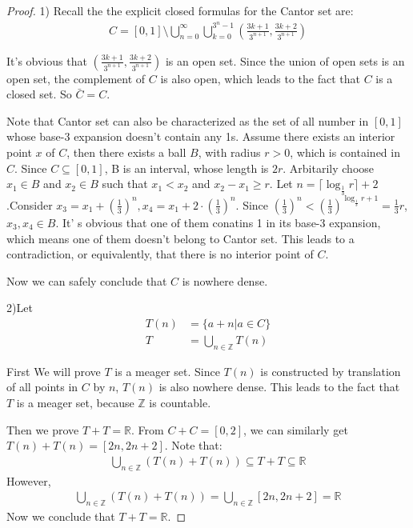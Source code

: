 \documentclass[a4paper, linespread=1.5]{article}
\begin{document}
	\begin{proof}
		1) Recall the the explicit closed formulas for the Cantor set are:
		\begin{align*}
			C= [0,1]\setminus \bigcup\limits_{n=0}^\infty \bigcup\limits_{k=0}^{3^n-1}(\frac{3k+1}{3^{n+1}},\frac{3k+2}{3^{n+1}})
		\end{align*}
		
		It's obvious that $(\frac{3k+1}{3^{n+1}},\frac{3k+2}{3^{n+1}})$ is an open set. Since the union of open sets is an open set, the complement of $C$ is also open, which leads to the fact that $C$ is a closed set. So $\bar{C}=C$.
		
		Note that Cantor set can also be characterized as the set of all number in $[0,1]$ whose base-3 expansion doesn't contain any 1s. Assume there exists an interior point $x$ of $C$, then 
		there exists a ball $B$, with radius $r > 0$, which is contained in $C$. Since $C \subseteq [0,1]$, B is an interval, whose length is $2r$. Arbitarily choose $x_1 \in B$ and $x_2\in B$ such that $x_1<x_2$ and $x_2-x_1\ge r$. Let $n=\lceil\log_{\frac{1}{3}}r\rceil+2$.Consider $x_3=x_1+(\frac{1}{3})^n,x_4=x_1+2\cdot(\frac{1}{3})^n$. Since $(\frac{1}{3})^n<(\frac{1}{3})^{\log_\frac{1}{3}r+1}=\frac{1}{3}r$, $x_3,x_4\in B$.  It' s obvious that one of them conatins 1 in its base-3 expansion, which means one of them doesn't belong to Cantor set. This leads to a contradiction, or equivalently, that there is no interior point of $C$.
		
		Now we can safely conclude that $C$ is nowhere dense.
		
		2)Let 
		\begin{align*}
			T(n)&=\{a+n| a\in C\}\\ T&=\bigcup\limits_{n\in \mathbb{Z}}T(n)
		\end{align*}
		
		
		First We will prove $T$ is a meager set. Since $T(n)$ is constructed by translation of all points in $C$ by $n$, $T(n)$ is also nowhere dense. This leads to the fact that $T$ is a meager set, because $\mathbb{Z}$ is countable. 
		
		Then we prove $T+T=\mathbb{R}$. From $C+C=[0,2]$, we can similarly get $T(n)+T(n)=[2n,2n+2]$. Note that:
		\begin{align*}
			\bigcup\limits_{n\in\mathbb{Z}}(T(n)+T(n))\subseteq T+T \subseteq \mathbb{R}
		\end{align*} 
		However,
		\begin{align*}
			\bigcup\limits_{n\in\mathbb{Z}}(T(n)+T(n))=\bigcup\limits_{n\in\mathbb{Z}}[2n,2n+2]=\mathbb{R}
		\end{align*}
		Now we conclude that $T+T=\mathbb{R}$.
		

\end{proof}
\end{document}

